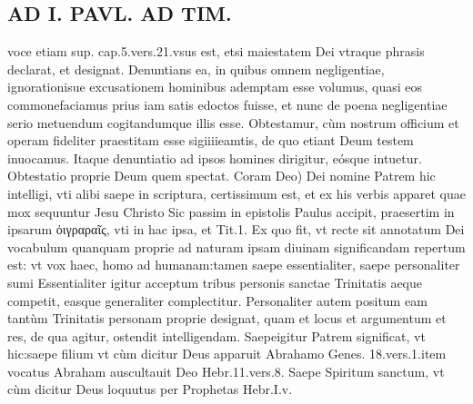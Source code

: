 \documentclass{article}
\begin{document}
\begin{pages}
\section*{AD I. PAVL. AD TIM. }
\marginpar{[ p.408. ]}\pstart voce etiam sup. cap.5.vers.21.vsus est, etsi maiestatem Dei vtraque phrasis declarat, et designat. Denuntians ea, in quibus omnem negligentiae, ignorationisue excusationem hominibus ademptam esse volumus, quasi eos commonefaciamus prius iam satis edoctos fuisse, et nunc de poena negligentiae serio metuendum cogitandumque illis esse. Obtestamur, cùm nostrum officium et operam fideliter praestitam esse sigiiiieamtis, de quo etiant Deum testem inuocamus. Itaque denuntiatio ad ipsos homines dirigitur, eósque intuetur. Obtestatio proprie Deum quem spectat.  \pend\pstart Coram Deo) Dei nomine Patrem hic intelligi, vti alibi saepe in scriptura, certissimum est, et ex his verbis apparet quae mox sequuntur Jesu Christo Sic passim in epistolis Paulus accipit, praesertim in ipsarum ὀιγραραῖς, vti in hac ipsa, et Tit.1. Ex quo fit, vt recte sit annotatum Dei vocabulum quanquam proprie ad naturam ipsam diuinam significandam repertum est: vt vox haec, homo ad humanam:tamen saepe essentialiter, saepe personaliter sumi Essentialiter igitur acceptum tribus personis sanctae Trinitatis aeque competit, easque generaliter complectitur. Personaliter autem positum eam tantùm Trinitatis personam proprie designat, quam et locus et argumentum et res, de qua agitur, ostendit intelligendam. Saepeigitur Patrem significat, vt hic:saepe filium vt cùm dicitur Deus apparuit Abrahamo Genes. 18.vers.1.item vocatus Abraham auscultauit Deo Hebr.11.vers.8. Saepe Spiritum sanctum, vt cùm dicitur Deus loquutus per Prophetas Hebr.I.v.  \pend

\end{pages}
\end{document}
